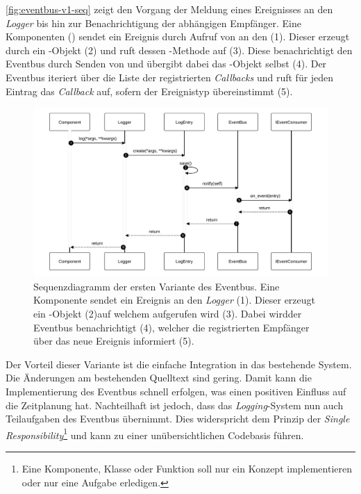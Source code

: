 \autoref{fig:eventbus-v1-seq} zeigt den Vorgang der Meldung eines Ereignisses an den \emph{Logger} bis hin zur Benachrichtigung der abhängigen Empfänger. Eine Komponenten () sendet ein Ereignis durch Aufruf von  an den  (1). Dieser erzeugt durch  ein -Objekt (2) und ruft dessen -Methode auf (3). Diese benachrichtigt den Eventbus durch Senden von  und übergibt dabei das -Objekt selbst (4). Der Eventbus iteriert über die Liste der registrierten \emph{Callbacks} und ruft für jeden Eintrag das \emph{Callback} auf, sofern der Ereignistyp übereinstimmt (5).\\

\begin{figure}[!ht]
	\centering
	\includegraphics[width=1.0\linewidth]{images/diagrams/eventbus-v1-seq.pdf}
	\caption{Sequenzdiagramm der ersten Variante des Eventbus. Eine Komponente sendet ein Ereignis an den \emph{Logger} (1). Dieser erzeugt ein -Objekt (2)auf welchem  aufgerufen wird (3). Dabei wirdder Eventbus benachrichtigt (4), welcher die registrierten Empfänger über das neue Ereignis informiert (5).}
	\label{fig:eventbus-v1-seq}
\end{figure}

Der Vorteil dieser Variante ist die einfache Integration in das bestehende System. Die Änderungen am bestehenden Quelltext sind gering. Damit kann die Implementierung des Eventbus schnell erfolgen, was einen positiven Einfluss auf die Zeitplanung hat. Nachteilhaft ist jedoch, dass das \emph{Logging}-System nun auch Teilaufgaben des Eventbus übernimmt. Dies widerspricht dem Prinzip der \emph{Single Responsibility}\footnote{Eine Komponente, Klasse oder Funktion soll nur ein Konzept implementieren oder nur eine Aufgabe erledigen.} und kann zu einer unübersichtlichen Codebasis führen.


